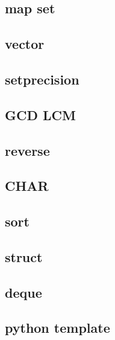         \subsection{map set}
                
        \subsection{vector}
                
        \subsection{setprecision}
                
        \subsection{GCD LCM}
                
        \subsection{reverse}
                
        \subsection{CHAR}
                
        \subsection{sort}
                
        \subsection{struct}
                
        \subsection{deque}
                
        \subsection{python template}
                    